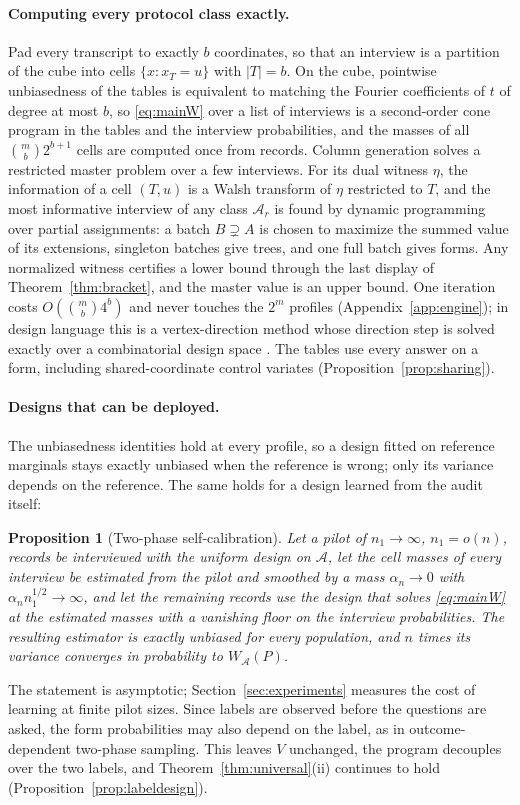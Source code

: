 \documentclass{article}
\newtheorem{proposition}[theorem]{Proposition}
\newcommand{\A}{\mathcal A}
\begin{document}
\paragraph{Computing every protocol class exactly.}
Pad every transcript to exactly $b$ coordinates, so that an interview is a partition of the cube into cells $\{x:x_T=u\}$ with $|T|=b$. On the cube, pointwise unbiasedness of the tables is equivalent to matching the Fourier coefficients of $t$ of degree at most $b$, so \eqref{eq:mainW} over a list of interviews is a second-order cone program in the tables and the interview probabilities, and the masses of all $\binom mb2^{b+1}$ cells are computed once from records. Column generation solves a restricted master problem over a few interviews. For its dual witness $\eta$, the information of a cell $(T,u)$ is a Walsh transform of $\eta$ restricted to $T$, and the most informative interview of any class $\A_r$ is found by dynamic programming over partial assignments: a batch $B\supsetneq A$ is chosen to maximize the summed value of its extensions, singleton batches give trees, and one full batch gives forms. Any normalized witness certifies a lower bound through the last display of Theorem~\ref{thm:bracket}, and the master value is an upper bound. One iteration costs $O(\binom mb4^b)$ and never touches the $2^m$ profiles (Appendix~\ref{app:engine}); in design language this is a vertex-direction method whose direction step is solved exactly over a combinatorial design space \citep{fedorov1972,wynn1970}. The tables use every answer on a form, including shared-coordinate control variates (Proposition~\ref{prop:sharing}).

\paragraph{Designs that can be deployed.}
The unbiasedness identities hold at every profile, so a design fitted on reference marginals stays exactly unbiased when the reference is wrong; only its variance depends on the reference. The same holds for a design learned from the audit itself:

\begin{proposition}[Two-phase self-calibration]\label{prop:selfcalmain}
Let a pilot of $n_1\to\infty$, $n_1=o(n)$, records be interviewed with the uniform design on $\A$, let the cell masses of every interview be estimated from the pilot and smoothed by a mass $\alpha_n\to0$ with $\alpha_n n_1^{1/2}\to\infty$, and let the remaining records use the design that solves \eqref{eq:mainW} at the estimated masses with a vanishing floor on the interview probabilities. The resulting estimator is exactly unbiased for every population, and $n$ times its variance converges in probability to $W_\A(P)$.
\end{proposition}
The statement is asymptotic; Section~\ref{sec:experiments} measures the cost of learning at finite pilot sizes. Since labels are observed before the questions are asked, the form probabilities may also depend on the label, as in outcome-dependent two-phase sampling. This leaves $V$ unchanged, the program decouples over the two labels, and Theorem~\ref{thm:universal}(ii) continues to hold (Proposition~\ref{prop:labeldesign}).
\end{document}
